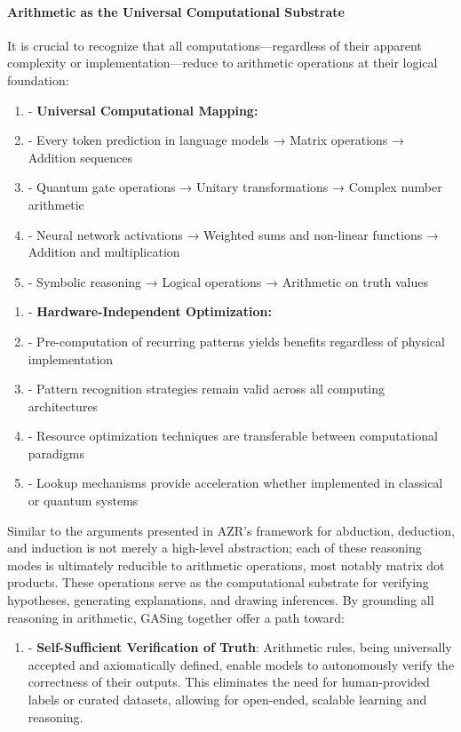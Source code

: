 \paragraph{Arithmetic as the Universal Computational Substrate}
It is crucial to recognize that all computations—regardless of their apparent complexity or implementation—reduce to arithmetic operations at their logical foundation:

\begin{enumerate}
  \item - \textbf{Universal Computational Mapping:}
  \item - Every token prediction in language models → Matrix operations → Addition sequences
  \item - Quantum gate operations → Unitary transformations → Complex number arithmetic
  \item - Neural network activations → Weighted sums and non-linear functions → Addition and multiplication
  \item - Symbolic reasoning → Logical operations → Arithmetic on truth values
\end{enumerate}

\begin{enumerate}
  \item - \textbf{Hardware-Independent Optimization:}
  \item - Pre-computation of recurring patterns yields benefits regardless of physical implementation
  \item - Pattern recognition strategies remain valid across all computing architectures
  \item - Resource optimization techniques are transferable between computational paradigms
  \item - Lookup mechanisms provide acceleration whether implemented in classical or quantum systems
\end{enumerate}

Similar to the arguments presented in AZR's framework for abduction, deduction, and induction is not merely a high-level abstraction; each of these reasoning modes is ultimately reducible to arithmetic operations, most notably matrix dot products. These operations serve as the computational substrate for verifying hypotheses, generating explanations, and drawing inferences. By grounding all reasoning in arithmetic, GASing together offer a path toward:

\begin{enumerate}
  \item - \textbf{Self-Sufficient Verification of Truth}: Arithmetic rules, being universally accepted and axiomatically defined, enable models to autonomously verify the correctness of their outputs. This eliminates the need for human-provided labels or curated datasets, allowing for open-ended, scalable learning and reasoning.
\end{enumerate}

